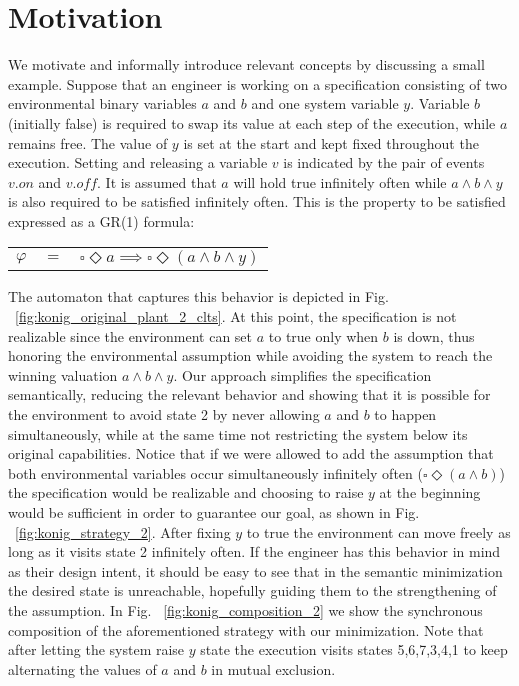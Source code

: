 \section{Motivation}\label{sec:motivation}
We motivate and informally introduce relevant concepts by discussing a small example. 
Suppose that an engineer is working on a specification consisting of two environmental 
binary variables $a$ and $b$ and one system variable $y$. Variable $b$ 
(initially false) is required to swap its value at each step of the execution, while $a$ 
remains free. The value of $y$ is set at the start and kept fixed throughout the 
execution. Setting and releasing a variable $v$ is indicated by the pair of events $v.on$ and $v.off$.
It is assumed that $a$ will hold true infinitely often while $a \wedge b \wedge y$ is also required to be satisfied infinitely often. This is the property to be satisfied expressed as a GR(1) formula: 
\begin{center}
	\begin{tabular}{ r c l }
		$\varphi$& $=$ &$\square \Diamond a\implies\square \Diamond (a \wedge b \wedge y)$\\
	\end{tabular}
\end{center}
The automaton that captures this behavior is depicted in Fig. ~\ref{fig:konig_original_plant_2_clts}. At this point, the specification is not realizable since the environment can set $a$ to true only when $b$ is down, thus honoring the environmental assumption while avoiding the system to reach the winning valuation $a \wedge b \wedge y$.  
Our approach simplifies the specification semantically, reducing the relevant behavior and showing that it is possible for the environment to avoid state 2 by never allowing $a$ and $b$ to happen simultaneously, while at the same time not restricting the system below its original capabilities.
 Notice that if we were allowed to add the assumption that both environmental variables occur simultaneously infinitely often ($\square \Diamond (a \wedge b)$) the specification would be realizable and choosing to raise $y$ at the beginning would be sufficient in order to guarantee our goal, as shown in Fig. ~\ref{fig:konig_strategy_2}. After fixing $y$ to true the environment can move freely as long as it visits state 2 infinitely often. If the engineer has this behavior in mind as their design intent, it should be easy to see that in the semantic minimization the desired state is unreachable, hopefully guiding them to the strengthening of the assumption.  In Fig. ~\ref{fig:konig_composition_2} we show the synchronous composition of the aforementioned strategy with our minimization. Note that after letting the system raise $y$ state the execution visits states 5,6,7,3,4,1 to keep alternating the values of $a$ and $b$ in mutual exclusion.

